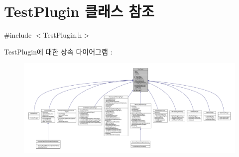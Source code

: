 \hypertarget{class_test_plugin}{}\section{Test\+Plugin 클래스 참조}
\label{class_test_plugin}


{\ttfamily \#include $<$Test\+Plugin.\+h$>$}



Test\+Plugin에 대한 상속 다이어그램 \+: 
\nopagebreak
\begin{figure}[H]
\begin{center}
\leavevmode
\includegraphics[width=350pt]{class_test_plugin__inherit__graph}
\end{center}
\end{figure}


